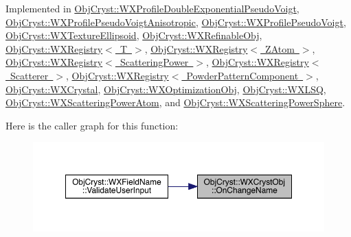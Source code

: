 Implemented in \mbox{\hyperlink{class_obj_cryst_1_1_w_x_profile_double_exponential_pseudo_voigt_a292ef2513ec055a34d55b6b09b64213d}{Obj\+Cryst\+::\+W\+X\+Profile\+Double\+Exponential\+Pseudo\+Voigt}}, \mbox{\hyperlink{class_obj_cryst_1_1_w_x_profile_pseudo_voigt_anisotropic_a1551c8bb8fbfcb4e26a5e8398be20642}{Obj\+Cryst\+::\+W\+X\+Profile\+Pseudo\+Voigt\+Anisotropic}}, \mbox{\hyperlink{class_obj_cryst_1_1_w_x_profile_pseudo_voigt_a6b1ba0fce0c78461e4ea3987893501b2}{Obj\+Cryst\+::\+W\+X\+Profile\+Pseudo\+Voigt}}, \mbox{\hyperlink{class_obj_cryst_1_1_w_x_texture_ellipsoid_afafd05d7a7d623a3a24334bf945827c9}{Obj\+Cryst\+::\+W\+X\+Texture\+Ellipsoid}}, \mbox{\hyperlink{class_obj_cryst_1_1_w_x_refinable_obj_a1a13aaa3b69044cff0d1c257dea2acb0}{Obj\+Cryst\+::\+W\+X\+Refinable\+Obj}}, \mbox{\hyperlink{class_obj_cryst_1_1_w_x_registry_a2da67455f80e111092ed22410607e842}{Obj\+Cryst\+::\+W\+X\+Registry$<$ T $>$}}, \mbox{\hyperlink{class_obj_cryst_1_1_w_x_registry_a2da67455f80e111092ed22410607e842}{Obj\+Cryst\+::\+W\+X\+Registry$<$ Z\+Atom $>$}}, \mbox{\hyperlink{class_obj_cryst_1_1_w_x_registry_a2da67455f80e111092ed22410607e842}{Obj\+Cryst\+::\+W\+X\+Registry$<$ Scattering\+Power $>$}}, \mbox{\hyperlink{class_obj_cryst_1_1_w_x_registry_a2da67455f80e111092ed22410607e842}{Obj\+Cryst\+::\+W\+X\+Registry$<$ Scatterer $>$}}, \mbox{\hyperlink{class_obj_cryst_1_1_w_x_registry_a2da67455f80e111092ed22410607e842}{Obj\+Cryst\+::\+W\+X\+Registry$<$ Powder\+Pattern\+Component $>$}}, \mbox{\hyperlink{class_obj_cryst_1_1_w_x_crystal_a7a15c2d1b5f5997ace336724fc396892}{Obj\+Cryst\+::\+W\+X\+Crystal}}, \mbox{\hyperlink{class_obj_cryst_1_1_w_x_optimization_obj_a01117540dd4857fd238caf16c391a691}{Obj\+Cryst\+::\+W\+X\+Optimization\+Obj}}, \mbox{\hyperlink{class_obj_cryst_1_1_w_x_l_s_q_a077a2e40b76f733666b56699ee8f56fc}{Obj\+Cryst\+::\+W\+X\+L\+SQ}}, \mbox{\hyperlink{class_obj_cryst_1_1_w_x_scattering_power_atom_ac1b203e5de8d1827e6dba7f8715d1228}{Obj\+Cryst\+::\+W\+X\+Scattering\+Power\+Atom}}, and \mbox{\hyperlink{class_obj_cryst_1_1_w_x_scattering_power_sphere_a7f3614f0711d1a2ef1fca4a60789129e}{Obj\+Cryst\+::\+W\+X\+Scattering\+Power\+Sphere}}.

Here is the caller graph for this function\+:
\nopagebreak
\begin{figure}[H]
\begin{center}
\leavevmode
\includegraphics[width=350pt]{class_obj_cryst_1_1_w_x_cryst_obj_a3736357599263df7e550790753c040a3_icgraph}
\end{center}
\end{figure}
\mbox{\label{class_obj_cryst_1_1_w_x_cryst_obj_ae55c3091101cae5d79e5aacb77c48856}} 

